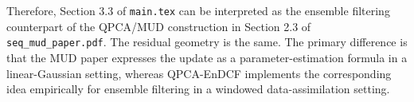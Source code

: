 \documentclass[11pt]{article}
\begin{document}
Therefore, Section 3.3 of \texttt{main.tex} can be interpreted as the ensemble filtering counterpart of the QPCA/MUD construction in Section 2.3 of \texttt{seq\_mud\_paper.pdf}. The residual geometry is the same. The primary difference is that the MUD paper expresses the update as a parameter-estimation formula in a linear-Gaussian setting, whereas QPCA-EnDCF implements the corresponding idea empirically for ensemble filtering in a windowed data-assimilation setting.
\end{document}
